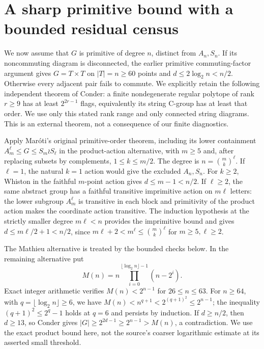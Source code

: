 \section{A sharp primitive bound with a bounded residual census}
We now assume that $G$ is primitive of degree $n$, distinct from $A_n,S_n$.
If its noncommuting diagram is disconnected, the earlier primitive
commuting-factor argument gives $G=T\times T$ on $|T|=n\geq60$ points
and $d\leq2\log_2n<n/2$. Otherwise every adjacent pair fails to commute.
We explicitly retain the following independent theorem of Conder:
a finite nondegenerate regular polytope of rank $r\geq9$ has at least
$2^{2r-1}$ flags, equivalently its string C-group has at least that order.
We use only this stated rank range and only connected string diagrams.
This is an external theorem, not a consequence of our finite diagnostics.

Apply Mar\'oti's original primitive-order theorem, including its lower
containment $A_m^\ell\leq G\leq S_m\wr S_\ell$ in the product-action
alternative, with $m\geq5$ and, after replacing subsets by complements,
$1\leq k\leq m/2$. The degree is $n=\binom m k^\ell$.
If $\ell=1$, the natural $k=1$ action would give the excluded $A_n,S_n$.
For $k\geq2$, Whiston in the faithful $m$-point action gives
$d\leq m-1<n/2$. If $\ell\geq2$, the same abstract group has a faithful
transitive imprimitive action on $m\ell$ letters: the lower subgroup
$A_m^\ell$ is transitive in each block and primitivity of the product
action makes the coordinate action transitive. The induction hypothesis at the strictly smaller degree $m\ell<n$
provides the imprimitive bound and gives $d\leq m\ell/2+1<n/2$, since
$m\ell+2<m^\ell\leq\binom m k^\ell$ for $m\geq5,\ell\geq2$.

The Mathieu alternative is treated by the bounded checks below.
In the remaining alternative put
\[
 M(n)=n\prod_{i=0}^{\lfloor\log_2n\rfloor-1}(n-2^i).
\]
Exact integer arithmetic verifies $M(n)<2^{n-1}$ for $26\leq n\leq63$.
For $n\geq64$, with $q=\lfloor\log_2n\rfloor\geq6$, we have
$M(n)<n^{q+1}<2^{(q+1)^2}\leq2^{n-1}$; the inequality
$(q+1)^2\leq2^q-1$ holds at $q=6$ and persists by induction.
If $d\geq n/2$, then $d\geq13$, so Conder gives
$|G|\geq2^{2d-1}\geq2^{n-1}>M(n)$, a contradiction.
We use the exact product bound here, not the source's coarser logarithmic
estimate at its asserted small threshold.

